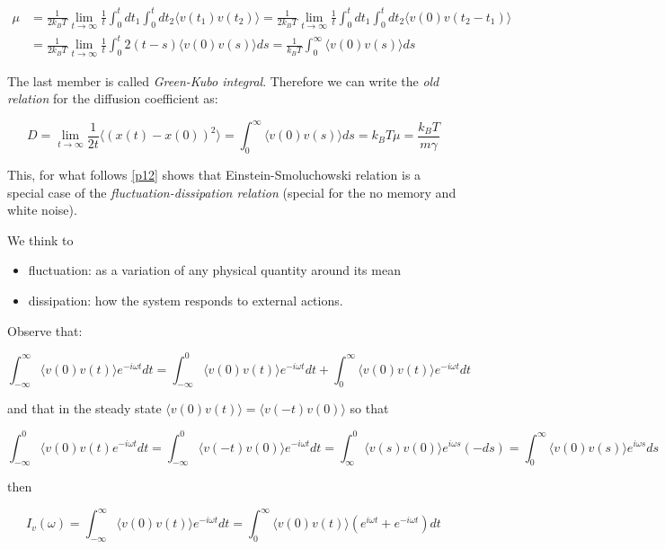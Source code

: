 \documentclass{article}
\begin{document}
\begin{align*}
\mu & = \frac{1}{2 k_B T} \lim\limits_{t \to \infty } \frac{1}{t} \int_{0}^{t} dt_1 \int_{0}^{t} dt_2 \langle v(t_1) v(t_2) \rangle = \frac{1}{2 k_B T} \lim\limits_{t \to \infty } \frac{1}{t} \int_{0}^{t} dt_1 \int_{0}^{t} dt_2 \langle v(0) v(t_2 -t_1 ) \rangle \\
& =  \frac{1}{2 k_B T} \lim\limits_{t \to \infty } \frac{1}{t} \int_{0}^{t} 2(t-s)  \langle v(0) v(s) \rangle ds = \frac{1}{k_B T} \int_{0}^{\infty} \langle v(0) v(s) \rangle ds
\end{align*}

The last member is called \emph{Green-Kubo integral}. Therefore we can write the \emph{old relation} for the diffusion coefficient as:

\begin{equation}
D = \lim\limits_{t \to \infty} \frac{1}{2t} \langle (x(t)-x(0))^2 \rangle  = \int_{0}^{\infty} \langle v(0) v(s) \rangle ds = k_B T \mu = \frac{k_B T}{m \gamma} \label{diffcal}
\end{equation}

This, for what follows \ref{p12} shows that Einstein-Smoluchowski relation is a special case of the \emph{fluctuation-dissipation relation} (special for the no memory and white noise). 

We think to 

\begin{itemize}
\item fluctuation: as a variation of any physical quantity around its mean
\item dissipation: how the system responds to external actions.
\end{itemize}
Observe that:

$$
\int_{- \infty}^{\infty} \langle v(0)v(t) \rangle e^{-i \omega t}dt  = \int_{- \infty}^{0} \langle v(0)v(t) \rangle e^{-i \omega t} dt + \int_{0}^{\infty} \langle v(0)v(t) \rangle e^{-i \omega t} dt
$$

and that in the steady state $\langle v(0)v(t) \rangle = \langle v(-t)v(0) \rangle$ so that

$$ \int_{- \infty}^{0} \langle v(0)v(t) e^{-i \omega t} dt = \int_{- \infty}^{0} \langle v(-t)v(0) \rangle e^{-i \omega t} dt = \int_{\infty}^{0} \langle v(s)v(0) \rangle e^{i \omega s} (-ds) = \int_{0}^{\infty} \langle v(0)v(s) \rangle e^{i \omega s} ds$$

then

$$ I_v(\omega) = \int_{- \infty}^{\infty} \langle v(0)v(t) \rangle e^{-i \omega t} dt = \int_{0}^{\infty} \langle v(0)v(t) \rangle ( e^{i \omega t}  + e^{-i \omega t}) dt $$
\end{document}
